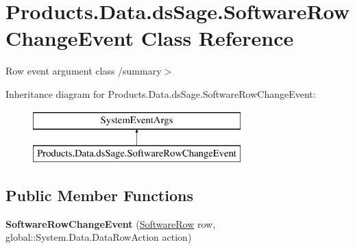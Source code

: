 \hypertarget{class_products_1_1_data_1_1ds_sage_1_1_software_row_change_event}{}\section{Products.\+Data.\+ds\+Sage.\+Software\+Row\+Change\+Event Class Reference}
\label{class_products_1_1_data_1_1ds_sage_1_1_software_row_change_event}


Row event argument class /summary$>$  


Inheritance diagram for Products.\+Data.\+ds\+Sage.\+Software\+Row\+Change\+Event\+:\begin{figure}[H]
\begin{center}
\leavevmode
\includegraphics[height=2.000000cm]{class_products_1_1_data_1_1ds_sage_1_1_software_row_change_event}
\end{center}
\end{figure}
\subsection*{Public Member Functions}
\begin{DoxyCompactItemize}
\item 
{\bfseries Software\+Row\+Change\+Event} (\hyperlink{class_products_1_1_data_1_1ds_sage_1_1_software_row}{Software\+Row} row, global\+::\+System.\+Data.\+Data\+Row\+Action action)\hypertarget{class_products_1_1_data_1_1ds_sage_1_1_software_row_change_event_a021c0cf877b6ad53ed7ee6835976d8f1}{}\label{class_products_1_1_data_1_1ds_sage_1_1_software_row_change_event_a021c0cf877b6ad53ed7ee6835976d8f1}

\end{DoxyCompactItemize}
